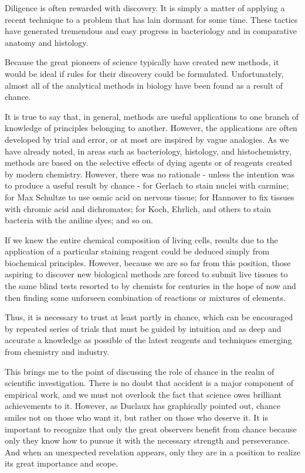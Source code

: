 \documentclass{article}
\begin{document}
Diligence is often rewarded with discovery. It is simply a matter of applying a recent technique to a problem that has lain dormant for some time. These tactics have generated tremendous and easy progress in bacteriology and in comparative anatomy and histology.

Because the great pioneers of science typically have created new methods, it would be ideal if rules for their discovery could be formulated. Unfortunately, almost all of the analytical methods in biology have been found as a result of chance.

It is true to say that, in general, methods are useful applications to one branch of knowledge of principles belonging to another. However, the applications are often developed by trial and error, or at most are inspired by vague analogies. As we have already noted, in areas such as bacteriology, histology, and histochemistry, methods are based on the selective effects of dying agents or of reagents created by modern chemistry. However, there was no rationale - unless the intention was to produce a useful result by chance - for Gerlach to stain nuclei with carmine; for Max Schultze to use osmic acid on nervous tissue; for Hannover to fix tissues with chromic acid and dichromates; for Koch, Ehrlich, and others to stain bacteria with the aniline dyes; and so on.

If we knew the entire chemical composition of living cells, results due to the application of a particular staining reagent could be deduced simply from biochemical principles. However, because we are so far from this position, those aspiring to discover new biological methods are forced to submit live tissues to the same blind tests resorted to by chemists for centuries in the hope of now and then finding some unforseen combination of reactions or mixtures of elements.

Thus, it is necessary to trust at least partly in chance, which can be encouraged by repeated series of trials that must be guided by intuition and as deep and accurate a knowledge as possible of the latest reagents and techniques emerging from chemistry and industry.

This brings me to the point of discussing the role of chance in the realm of scientific investigation. There is no doubt that accident is a major component of empirical work, and we must not overlook the fact that science owes brilliant achievements to it. However, as Duclaux has graphically pointed out, chance smiles not on those who want it, but rather on those who deserve it. It is important to recognize that only the great observers benefit from chance because only they know how to pursue it with the necessary strength and perseverance. And when an unexpected revelation appears, only they are in a position to realize its great importance and scope.
\end{document}
